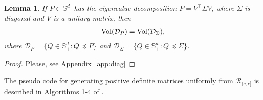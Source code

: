 \documentclass[Afour,sageh,times]{sagej}
\newcommand{\bt}{{\bf t}}
\newtheorem{remark}{\bf Remark}
\newtheorem{lemma}{\bf Lemma}
\begin{document}
% 

\begin{lemma}
\label{lemma:diag}
  \normalfont  If $P\in \mathbb{S}^d_{+}$ has the eigenvalue decomposition $P=V^\top \Sigma V$, where $\Sigma$ is diagonal and $V$ is a unitary matrix, then 
\begin{align}
    \textup{Vol}(\mathcal{D}_P)=\textup{Vol}(\mathcal{D}_{\Sigma}),
\end{align}
where $\mathcal{D}_P=\{Q\in \mathbb{S}^d_{+}: Q \preceq P\}$ and $\mathcal{D}_{\Sigma}=\{Q\in \mathbb{S}^d_{+}: Q \preceq \Sigma\}$.
\end{lemma}
\begin{proof}
{Please, see Appendix~\ref{app:diag}}
\end{proof}
The pseudo code for generating positive definite matrices uniformly from $\mathcal{R}_{(\underline{c},\bar{c}]}$ is described in Algorithms 1-4 of \cite{mittelbach2012sampling}.
\end{document}
